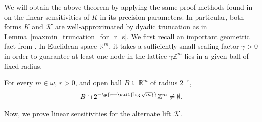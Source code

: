 We will obtain the above theorem by applying the same proof methods found in \cite{CL14} on the linear sensitivities of $K$ in its precision parameters. In particular, both forms $K$ and $\mathcal{K}$ are well-approximated by dyadic truncation as in Lemma~\ref{maxmin_truncation_for_r_s}. We first recall an important geometric fact from \cite{CL14}. In Euclidean space $\mathbb{R}^m$, it takes a sufficiently small scaling factor $\gamma > 0$ in order to guarantee at least one node
in the lattice $\gamma \mathbb{Z}^m$ lies in a given ball of fixed radius.

\begin{observation}
    \label{observation:grid_in_open_ball}
    For every $m \in \omega$, $r > 0$, and open ball $B \subseteq \mathbb{R}^m$ of radius $2^{-r}$, 
    \begin{align*}
        B \cap 2^{-\p{r + \ceil{\log \sqrt{m}}}} \mathbb{Z}^m \neq \emptyset.
    \end{align*}
\end{observation}

Now, we prove linear sensitivities for the alternate lift $\mathcal{K}$.

